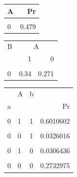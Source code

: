 \documentclass[
  10pt,
  dvipsnames,enabledeprecatedfontcommands]{scrartcl}
\begin{document}
\begin{figure}
\hspace{2mm}\begin{subfigure}[ht!]{0.45\textwidth}
\begin{table}[H]
\centering
\begin{tabular}{lr}
\toprule
A & Pr\\
\midrule
\cellcolor{gray!6}{1} & \cellcolor{gray!6}{0.521}\\
0 & 0.479\\
\bottomrule
\end{tabular}
\end{table}

\begin{table}[H]
\centering
\begin{tabular}{lrr}
\toprule
\multicolumn{1}{c}{B} & \multicolumn{2}{c}{A} \\
  & 1 & 0\\
\midrule
\cellcolor{gray!6}{1} & \cellcolor{gray!6}{0.66} & \cellcolor{gray!6}{0.729}\\
0 & 0.34 & 0.271\\
\bottomrule
\end{tabular}
\end{table}

\begin{table}[H]
\centering
\begin{tabular}{lllr}
\toprule
\multicolumn{1}{c}{} & \multicolumn{1}{c}{A} & \multicolumn{1}{c}{b} & \multicolumn{1}{c}{} \\
a &  &  & Pr\\
\midrule
\cellcolor{gray!6}{1} & \cellcolor{gray!6}{1} & \cellcolor{gray!6}{1} & \cellcolor{gray!6}{0.3989398}\\
0 & 1 & 1 & 0.6010602\\
\cellcolor{gray!6}{1} & \cellcolor{gray!6}{0} & \cellcolor{gray!6}{1} & \cellcolor{gray!6}{0.9673984}\\
0 & 0 & 1 & 0.0326016\\
\cellcolor{gray!6}{1} & \cellcolor{gray!6}{1} & \cellcolor{gray!6}{0} & \cellcolor{gray!6}{0.9693564}\\
0 & 1 & 0 & 0.0306436\\
\cellcolor{gray!6}{1} & \cellcolor{gray!6}{0} & \cellcolor{gray!6}{0} & \cellcolor{gray!6}{0.7267025}\\
0 & 0 & 0 & 0.2732975\\
\bottomrule
\end{tabular}
\end{table}


\end{subfigure}
\end{figure}
\end{document}
